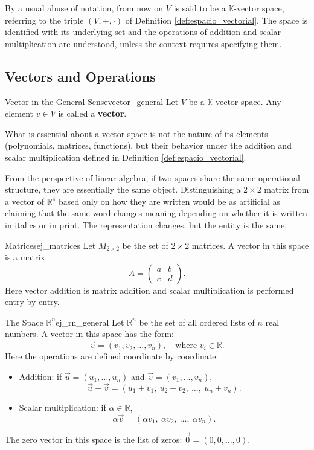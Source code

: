 \documentclass[11pt, a4paper]{article}
\begin{document}
\obs By a usual abuse of notation, from now on $V$ is said to be a $\mathbb{K}$-vector space, referring to the triple $(V, +, \cdot)$ of Definition \ref{def:espacio_vectorial}. The space is identified with its underlying set and the operations of addition and scalar multiplication are understood, unless the context requires specifying them.

\subsection{Vectors and Operations}

\begin{definicion}{Vector in the General Sense}{vector_general}
Let $V$ be a $\mathbb{K}$-vector space. Any element $v \in V$ is called a \textbf{vector}.
\end{definicion}

\obs What is essential about a vector space is not the nature of its elements (polynomials, matrices, functions), but their behavior under the addition and scalar multiplication defined in Definition \ref{def:espacio_vectorial}.

From the perspective of linear algebra, if two spaces share the same operational structure, they are essentially the same object. Distinguishing a $2\times 2$ matrix from a vector of $\mathbb{R}^4$ based only on how they are written would be as artificial as claiming that the same word changes meaning depending on whether it is written in italics or in print. The representation changes, but the entity is the same.

\begin{ejemplo}{Matrices}{ej_matrices}
Let $M_{2\times 2}$ be the set of $2 \times 2$ matrices. A vector in this space is a matrix:
\[
A = \begin{pmatrix} a & b \\ c & d \end{pmatrix}.
\]
Here vector addition is matrix addition and scalar multiplication is performed entry by entry.
\end{ejemplo}

\begin{ejemplo}{The Space $\mathbb{R}^n$}{ej_rn_general}
Let $\mathbb{R}^n$ be the set of all ordered lists of $n$ real numbers.
A vector in this space has the form:
\[
\vec{v} = (v_1, v_2, \dots, v_n), \quad \text{where } v_i \in \mathbb{R}.
\]
Here the operations are defined coordinate by coordinate:
\begin{itemize}
    \item Addition: if $\vec{u} = (u_1, \dots, u_n)$ and $\vec{v} = (v_1, \dots, v_n)$,
    \[
    \vec{u} + \vec{v} = (u_1 + v_1, \ u_2 + v_2, \ \dots, \ u_n + v_n).
    \]
    \item Scalar multiplication: if $\alpha \in \mathbb{R}$,
    \[
    \alpha \vec{v} = (\alpha v_1, \ \alpha v_2, \ \dots, \ \alpha v_n).
    \]
\end{itemize}
The zero vector in this space is the list of zeros: $\vec{0} = (0, 0, \dots, 0)$.
\end{ejemplo}
\end{document}
